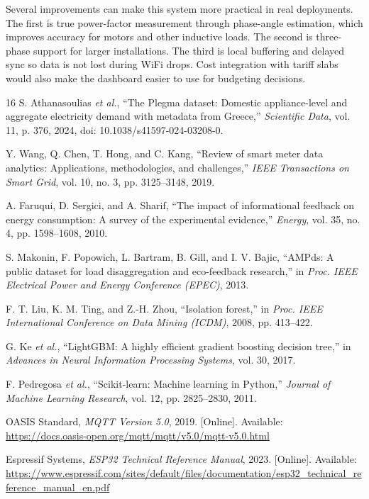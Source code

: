 \documentclass[12pt, a4paper]{article}
\numberwithin{figure}{section}
\numberwithin{table}{section}
\begin{document}
	Several improvements can make this system more practical in real deployments. The first is true power-factor measurement through phase-angle estimation, which improves accuracy for motors and other inductive loads. The second is three-phase support for larger installations. The third is local buffering and delayed sync so data is not lost during WiFi drops. Cost integration with tariff slabs would also make the dashboard easier to use for budgeting decisions.
	
	\newpage
	\label{sec:references}
	\begin{thebibliography}{16}
		S. Athanasoulias \emph{et al.}, ``The Plegma dataset: Domestic appliance-level and aggregate electricity demand with metadata from Greece,'' \emph{Scientific Data}, vol. 11, p. 376, 2024, doi: 10.1038/s41597-024-03208-0.
		
		Y. Wang, Q. Chen, T. Hong, and C. Kang, ``Review of smart meter data analytics: Applications, methodologies, and challenges,'' \emph{IEEE Transactions on Smart Grid}, vol. 10, no. 3, pp. 3125--3148, 2019.
		
		A. Faruqui, D. Sergici, and A. Sharif, ``The impact of informational feedback on energy consumption: A survey of the experimental evidence,'' \emph{Energy}, vol. 35, no. 4, pp. 1598--1608, 2010.
		
		S. Makonin, F. Popowich, L. Bartram, B. Gill, and I. V. Bajic, ``AMPds: A public dataset for load disaggregation and eco-feedback research,'' in \emph{Proc. IEEE Electrical Power and Energy Conference (EPEC)}, 2013.
		
		F. T. Liu, K. M. Ting, and Z.-H. Zhou, ``Isolation forest,'' in \emph{Proc. IEEE International Conference on Data Mining (ICDM)}, 2008, pp. 413--422.
		
		G. Ke \emph{et al.}, ``LightGBM: A highly efficient gradient boosting decision tree,'' in \emph{Advances in Neural Information Processing Systems}, vol. 30, 2017.
		
		F. Pedregosa \emph{et al.}, ``Scikit-learn: Machine learning in Python,'' \emph{Journal of Machine Learning Research}, vol. 12, pp. 2825--2830, 2011.
		
		OASIS Standard, \emph{MQTT Version 5.0}, 2019. [Online]. Available: \url{https://docs.oasis-open.org/mqtt/mqtt/v5.0/mqtt-v5.0.html}
		
		Espressif Systems, \emph{ESP32 Technical Reference Manual}, 2023. [Online]. Available: \url{https://www.espressif.com/sites/default/files/documentation/esp32_technical_reference_manual_en.pdf}
		

\end{thebibliography}
\end{document}
